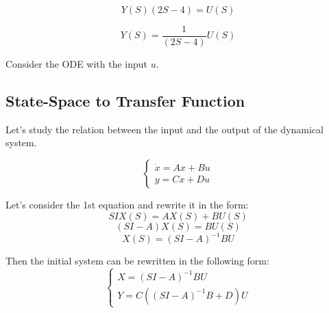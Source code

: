\begin{equation}
    Y(S)(2S - 4) = U(S)
\end{equation}

\begin{equation}
    Y(S) = \frac{1}{(2S - 4)} U(S)
\end{equation}

Consider the ODE with the input \(u\).

\subsection{State-Space to Transfer Function}

Let's study the relation between the input and the output of the dynamical system. 

\[
\begin{cases}
    \dot x = Ax + Bu \\
    y = Cx + Du
\end{cases}
\] 

Let's consider the 1st equation and rewrite it in the form:
\[SI X(S) = AX(S) + BU(S)\]
\[(SI-A) X(S) = BU(S)\]
\[X(S) = (SI-A)^{-1}BU\]

Then the initial system can be rewritten in the following form:
\[
\begin{cases}
    X = (SI-A)^{-1}BU\\
    Y = C((SI-A)^{-1}B + D)U
\end{cases}
\]
